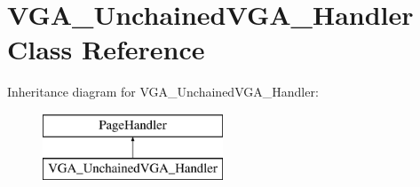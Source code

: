 \hypertarget{classVGA__UnchainedVGA__Handler}{\section{V\-G\-A\-\_\-\-Unchained\-V\-G\-A\-\_\-\-Handler Class Reference}
\label{classVGA__UnchainedVGA__Handler}
}
Inheritance diagram for V\-G\-A\-\_\-\-Unchained\-V\-G\-A\-\_\-\-Handler\-:\begin{figure}[H]
\begin{center}
\leavevmode
\includegraphics[height=2.000000cm]{classVGA__UnchainedVGA__Handler}
\end{center}
\end{figure}
